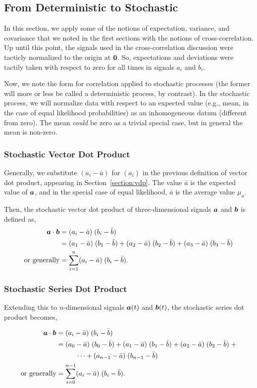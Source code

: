 \subsection{From Deterministic to Stochastic}
In this section, we apply some of the notions of expectation, 
variance, and covariance that we noted in the first sections with 
the notions of cross-correlation.  Up until this point, the signals
used in the cross-correlation discussion were tacticly normalized to the 
origin at $\mbox{\boldmath $0$}$.  So, expectations and deviations were tactily 
taken with respect to zero for all times in signals $a_i$ and $b_i$.

Now, we note the form for correlation applied to stochastic processes (the
former will more or less be called a deterministic process, by contrast).
In the stochastic process, we will 
normalize data with respect to an expected value (e.g., mean, in the case 
of equal likelihood probabilities) as an inhomogeneous datum (different 
from zero).  The mean {\em could} be zero as a trivial special case, but 
in general the mean is non-zero.

\subsubsection{Stochastic Vector Dot Product}
Generally, we substitute $(a_i - \bar{a})$ for $(a_i)$ in the previous 
definition of vector dot product, appearing in Section~\ref{section:vdp}.
The value $\bar{a}$ is the expected value of $\mbox{\boldmath $a$}$, and in the special 
case of equal likelihood, $\bar{a}$ is the average value $\mu_a$.

Then, the stochastic 
vector dot product of three-dimensional signals $\mbox{\boldmath $a$}$ and $\mbox{\boldmath $b$}$ is defined as, 
\begin{align}
 \mbox{\boldmath $a$} \cdot \mbox{\boldmath $b$} & = 
 (a_i-\bar{a}) \; (b_i-\bar{b})  \\
 & = 
 (a_1-\bar{a}) \; (b_1-\bar{b}) 
 +
 (a_2-\bar{a}) \; (b_2-\bar{b}) 
 +
 (a_3-\bar{a}) \; (b_3-\bar{b}) 
 \\
 \mbox{or generally} 
 & = 
 \sum_{i=1}^n (a_i-\bar{a}) \; (b_i-\bar{b}).
\end{align} 

\subsubsection{Stochastic Series Dot Product}
Extending this to $n$-dimensional signals $\mbox{\boldmath $a$}(t)$ and $\mbox{\boldmath $b$}(t)$, 
the stochastic series dot product becomes,

\begin{align}
 \mbox{\boldmath $a$} \cdot \mbox{\boldmath $b$} & = 
 (a_i - \bar{a}) \; (b_i - \bar{b}) \\
 & = 
 (a_0-\bar{a}) \; (b_0-\bar{b}) 
 + 
 (a_1-\bar{a}) \; (b_1-\bar{b}) 
 +
 (a_2-\bar{a}) \; (b_2-\bar{b}) 
 \; + \nonumber \\ 
 & \hspace{1cm} \cdots + 
 (a_{n-1} - \bar{a}) \; (b_{n-1} - \bar{b})
 \\
 \mbox{or generally} 
 & = 
 \sum_{i=0}^{n-1} (a_i-\bar{a}) \; (b_i-\bar{b}).
\end{align}

